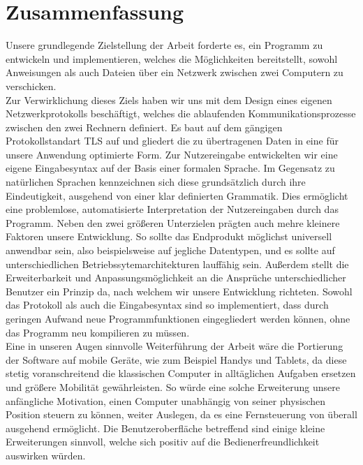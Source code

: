 %

%
\section*{Zusammenfassung}
Unsere grundlegende Zielstellung der Arbeit forderte es, ein Programm zu entwickeln und implementieren, welches die Möglichkeiten bereitstellt, sowohl Anweisungen als auch Dateien über ein Netzwerk zwischen zwei Computern zu verschicken.\\
Zur Verwirklichung dieses Ziels haben wir uns mit dem Design eines eigenen Netzwerkprotokolls beschäftigt, welches die ablaufenden Kommunikationsprozesse zwischen den zwei Rechnern definiert. 
Es baut auf dem gängigen Protokollstandart TLS auf und gliedert die zu übertragenen Daten in eine für unsere Anwendung optimierte Form. 
Zur Nutzereingabe entwickelten wir eine eigene Eingabesyntax auf der Basis einer formalen Sprache. 
Im Gegensatz zu natürlichen Sprachen kennzeichnen sich diese grundsätzlich durch ihre Eindeutigkeit, ausgehend von einer klar definierten Grammatik. 
Dies ermöglicht eine problemlose, automatisierte Interpretation der Nutzereingaben durch das Programm.
Neben den zwei größeren Unterzielen prägten auch mehre kleinere Faktoren unsere Entwicklung. 
So sollte das Endprodukt möglichst universell anwendbar sein, also beispielsweise auf jegliche Datentypen, und es sollte auf unterschiedlichen Betriebssytemarchitekturen lauffähig sein.
Außerdem stellt die Erweiterbarkeit und Anpassungsmöglichkeit an die Ansprüche unterschiedlicher Benutzer ein Prinzip da, nach welchem wir unsere Entwicklung richteten. 
Sowohl das Protokoll als auch die Eingabesyntax sind so implementiert, dass durch geringen Aufwand neue Programmfunktionen eingegliedert werden können, ohne das Programm neu kompilieren zu müssen.\\
Eine in unseren Augen sinnvolle Weiterführung der Arbeit wäre die Portierung der Software auf mobile Geräte, wie zum Beispiel Handys und Tablets, da diese stetig voranschreitend die klassischen Computer in alltäglichen Aufgaben ersetzen und größere Mobilität gewährleisten. 
So würde eine solche Erweiterung unsere anfängliche Motivation, einen Computer unabhängig von seiner physischen Position steuern zu können, weiter Auslegen, da es eine Fernsteuerung von überall ausgehend ermöglicht. 
Die Benutzeroberfläche betreffend sind einige kleine Erweiterungen sinnvoll, welche sich positiv auf die Bedienerfreundlichkeit auswirken würden. 

